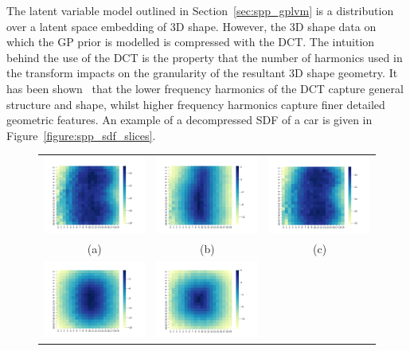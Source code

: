 The latent variable model outlined in Section~\ref{sec:spp_gplvm} is a distribution 
over a latent space embedding of 3D shape. However, the 3D shape data on which the GP 
prior is modelled is compressed with the DCT\@. The intuition behind the use of the DCT is 
the property that the number of harmonics used in the transform impacts on the granularity of 
the resultant 3D shape geometry. It has been shown~\cite{Ren2014} that the lower frequency 
harmonics of the DCT capture general structure and shape, whilst higher frequency harmonics 
capture finer detailed geometric features. An example of a decompressed SDF of a car is given 
in Figure~\ref{figure:spp_sdf_slices}.
\begin{figure}[!htbp]
  \centering
  \begin{tabular}{ccc}
    \includegraphics[width=.3\linewidth]{figures/spp/car_sdf_slices/x_0.png}&
		\includegraphics[width=.3\linewidth]{figures/spp/car_sdf_slices/x_10.png}&
		\includegraphics[width=.3\linewidth]{figures/spp/car_sdf_slices/x_19.png}\\
    (a) & (b) & (c) \\
    \includegraphics[width=.3\linewidth]{figures/spp/car_sdf_slices/y_0.png}&
		\includegraphics[width=.3\linewidth]{figures/spp/car_sdf_slices/y_10.png}&

\end{tabular}
\end{figure}
